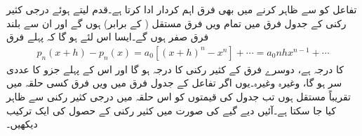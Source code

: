 تفاعل کو  سے ظاہر کرنے میں بھی فرق اہم کردار ادا کرتا ہے۔قدم  لیتے ہوئے  درجی کثیر رکنی  کے جدول فرق میں تمام  ویں فرق مستقل ( کے برابر) ہوں گے اور ان سے بلند فرق صفر ہوں گے۔ایسا اس لئے ہو گا کہ پہلے فرق 
\begin{align*}
p_n(x+h)-p_n(x)=a_0[(x+h)^n-x^n]+\cdots=a_0nhx^{n-1}+\cdots
\end{align*} 
کا درجہ  ہے، دوسرے فرق کے کثیر رکنی کا درجہ  ہو گا اور اس کے پہلے جزو کا عددی سر  ہو گا، وغیرہ وغیرہ۔یوں  اگر تفاعل  کے جدول فرق میں  ویں فرق کسی حلقہ میں تقریباً مستقل ہوں تب جدول کی قیمتوں کو اس حلقہ میں  درجی کثیر رکنی  سے ظاہر کیا جا سکتا ہے۔آئیں دیے  گیے   کی صورت میں کثیر رکنی  کے حصول کی ایک ترکیب دیکھیں۔     

